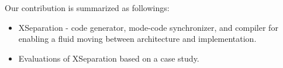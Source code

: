 
%

%

%






%


Our contribution is summarized as followings:

\begin{itemize}
	\item XSeparation - code generator, mode-code synchronizer, and compiler for enabling a fluid moving between architecture and implementation.
	
	\item Evaluations of XSeparation based on a case study.
\end{itemize}

